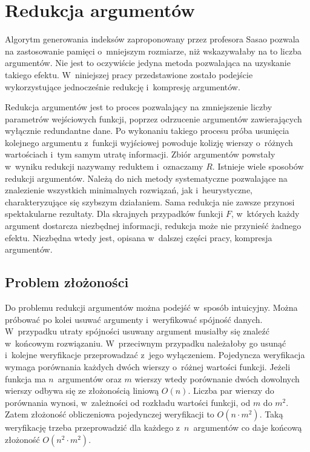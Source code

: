 \chapter{Redukcja argumentów}
\label{chapter:reduction}

Algorytm generowania indeksów zaproponowany przez profesora Sasao pozwala na zastosowanie pamięci o~mniejszym rozmiarze,
niż wskazywałaby na to liczba argumentów.
Nie jest to oczywiście jedyna metoda pozwalająca na uzyskanie takiego efektu.
W~niniejszej pracy przedstawione zostało podejście wykorzystujące jednocześnie redukcję i~kompresję argumentów.

Redukcja argumentów jest to proces pozwalający na zmniejszenie liczby parametrów wejściowych funkcji,
poprzez odrzucenie argumentów zawierających wyłącznie redundantne dane.
Po wykonaniu takiego procesu próba usunięcia kolejnego argumentu z~funkcji wyjściowej powoduje kolizję wierszy o~różnych wartościach i~tym samym utratę informacji.
Zbiór argumentów powstały w~wyniku redukcji nazywamy reduktem i~oznaczamy $R$.
Istnieje wiele sposobów redukcji argumentów.
Należą do nich metody systematyczne
pozwalające na znalezienie wszystkich minimalnych rozwiązań,
jak i~heurystyczne,
charakteryzujące się szybszym działaniem.
Sama redukcja nie zawsze przynosi spektakularne rezultaty.
Dla skrajnych przypadków funkcji $F$,
w~których każdy argument dostarcza niezbędnej informacji,
redukcja może nie przynieść żadnego efektu.
Niezbędna wtedy jest,
opisana w~dalszej części pracy,
kompresja argumentów.

\section{Problem złożoności}

Do problemu redukcji argumentów można podejść w~sposób intuicyjny.
Można próbować po kolei usuwać argumenty i~weryfikować spójność danych.
W~przypadku utraty spójności usuwany argument musiałby się znaleźć w~końcowym rozwiązaniu.
W~przeciwnym przypadku należałoby go usunąć i~kolejne weryfikacje przeprowadzać z~jego wyłączeniem.
Pojedyncza weryfikacja wymaga porównania każdych dwóch wierszy o~różnej wartości funkcji.
Jeżeli funkcja ma $n$~argumentów oraz $m$ wierszy wtedy porównanie dwóch dowolnych wierszy odbywa się ze złożonością liniową $O(n)$.
Liczba par wierszy do porównania wynosi,
w~zależności od rozkładu wartości funkcji,
od $m$ do $m^2$.
Zatem złożoność obliczeniowa pojedynczej weryfikacji to $O(n \cdot m^2)$.
Taką weryfikację trzeba przeprowadzić dla każdego z~$n$~argumentów co daje końcową złożoność $O(n^2 \cdot m^2)$.

